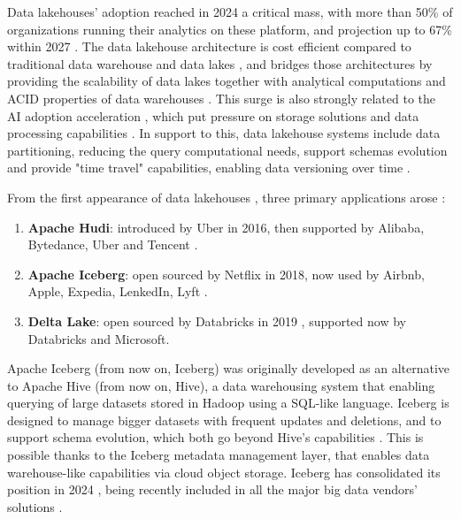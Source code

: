 Data lakehouses' adoption reached in 2024 a critical mass, with more than 50\% of organizations running their analytics on these platform, and projection up to 67\% within 2027 \cite{StateDataLakehouse2025}. The data lakehouse architecture \cite{lakehouse2021} is cost efficient compared to traditional data warehouse and data lakes \cite{DatalakehouseCostEfficiency}, and bridges those architectures by providing the scalability of data lakes together with analytical computations and \gls{ACID} properties of data warehouses \cite{lakehouse2021}. This surge is also strongly related to the AI adoption acceleration \cite{SurgeAI2024}, which put pressure on storage solutions and data processing capabilities \cite{StateDataLakehouse2025}. In support to this, data lakehouse systems include data partitioning, reducing the query computational needs, support schemas evolution and provide "time travel" capabilities, enabling data versioning over time \cite{crociDataLakehouseHype2022}.

From the first appearance of data lakehouses \cite{WhatLakehouse2020}, three primary applications arose \cite{ApacheHudiVs}: 
\begin{enumerate} 
    \item \textbf{Apache Hudi}: introduced by Uber in 2016, then supported by Alibaba, Bytedance, Uber and Tencent \cite{rajaperumalUberEngineeringIncremental2017}.
    \item \textbf{Apache Iceberg}: open sourced by Netflix in 2018, now used by Airbnb, Apple, Expedia, LenkedIn, Lyft \cite{IcebergExamples2024}.
    \item \textbf{Delta Lake}: open sourced by Databricks in 2019 \cite{armbrustDeltaLakeHighperformance2020}, supported now by Databricks and Microsoft.
\end{enumerate}

Apache Iceberg (from now on, Iceberg) was originally developed as an alternative to Apache Hive (from now on, Hive), a data warehousing system that enabling querying of large datasets stored in Hadoop using a SQL-like language. Iceberg is designed to manage bigger datasets with frequent updates and deletions, and to support schema evolution, which both go beyond Hive's capabilities \cite{shiranApacheIcebergDefinitive2024}. This is possible thanks to the Iceberg metadata management layer, that enables data warehouse-like capabilities via cloud object storage. Iceberg has consolidated its position in 2024 \cite{IcebergNewHadoop}, being recently included in all the major big data vendors' solutions \cite{BigDataVendorIceberg}.

